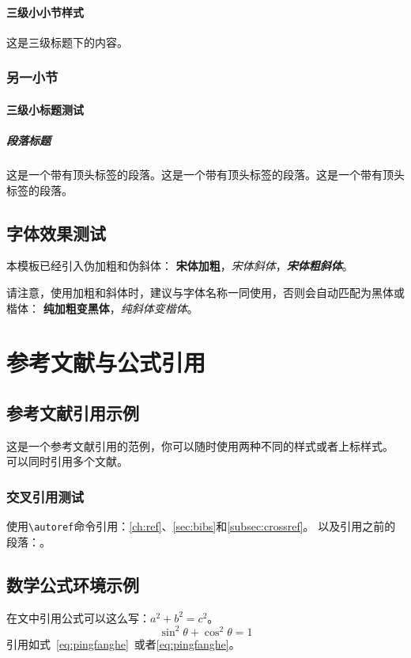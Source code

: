 \documentclass{ccu_thesis}
\begin{document}
\subsubsection{三级小小节样式}
这是三级标题下的内容。
\subsection{另一小节}
\subsubsection{三级小标题测试}\label{subsubsubsec:test}

\paragraph{段落标题}\label{para:para}这是一个带有顶头标签的段落。这是一个带有顶头标签的段落。这是一个带有顶头标签的段落。

\section{字体效果测试}
本模板已经引入伪加粗和伪斜体：
{\songti \bfseries 宋体加粗}，{\songti \itshape 宋体斜体}，{\songti \bfseries \itshape 宋体粗斜体}。

请注意，使用加粗和斜体时，建议与字体名称一同使用，否则会自动匹配为黑体或楷体：
{\bfseries 纯加粗变黑体}，{\itshape 纯斜体变楷体}。

\chapter{参考文献与公式引用}\label{ch:ref}
\section{参考文献引用示例}\label{sec:bibs}
这是一个参考文献引用的范例\cite{Stone_1998}，你可以随时使用两种不同的样式\cite{Stone_1998}或者上标样式。
可以同时引用多个文献\cite{Stone_1998,9780124467422,huagongrenzheng2014}。

\subsection{交叉引用测试}\label{subsec:crossref}
使用\verb|\autoref|命令引用：\autoref{ch:ref}、\autoref{sec:bibs}和\autoref{subsec:crossref}。
以及引用之前的段落：。

\section{数学公式环境示例}
在文中引用公式可以这么写：$a^2+b^2=c^2$。
\begin{equation}
	\sin^2{\theta}+\cos^2{\theta}=1 \label{eq:pingfanghe}
\end{equation}
引用如式~\eqref{eq:pingfanghe}~或者\autoref{eq:pingfanghe}。
\end{document}

